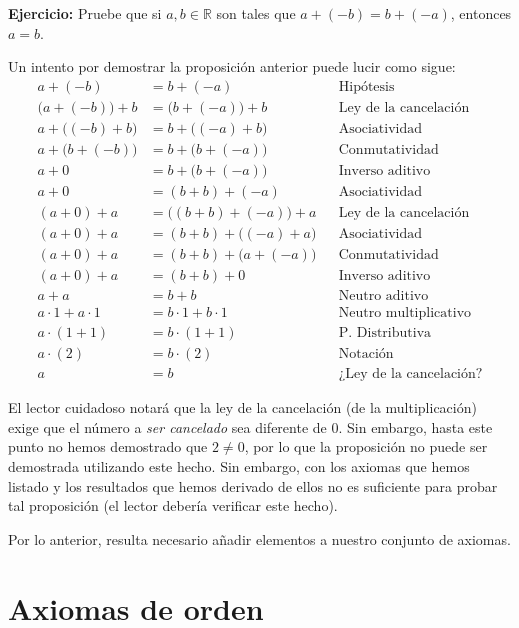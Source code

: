 \documentclass[11pt]{article}
\newcommand{\R}{\mathbb{R}}
\begin{document}
\textbf{Ejercicio:} Pruebe que si $a,b\in \R$ son tales que $a+(-b)=b+(-a)$, entonces $a=b$.
    
Un intento por demostrar la proposición anterior puede lucir como sigue: \begin{align*}
a+(-b)&=b+(-a) && \text{Hipótesis} \\
\bigl(a+(-b)\bigr)+b&=\bigl(b+(-a)\bigr)+b&&\text{Ley de la cancelación} \\
a + \bigl((-b)+b\bigr)&= b+\bigl((-a)+b\bigr)&&\text{Asociatividad} \\
a + \bigl(b+(-b)\bigr)&= b+\bigl(b+(-a)\bigr)&&\text{Conmutatividad} \\
a + 0&= b+\bigl(b+(-a)\bigr)&&\text{Inverso aditivo} \\
a + 0&= (b+b)+(-a)&&\text{Asociatividad} \\
(a + 0) + a&= \bigl((b+b)+(-a)\bigr)+a&&\text{Ley de la cancelación} \\
(a + 0) + a&= (b+b)+\bigl((-a)+a\bigr)&&\text{Asociatividad} \\
(a + 0) + a&= (b+b)+\bigl(a+(-a)\bigr)&&\text{Conmutatividad} \\
(a + 0) + a&= (b+b)+0&&\text{Inverso aditivo} \\
a+ a&= b+b&&\text{Neutro aditivo} \\
a\cdot 1+ a\cdot 1&= b\cdot 1+ b\cdot 1&&\text{Neutro multiplicativo} \\
a\cdot (1+1)&= b\cdot (1+1)&&\text{P. Distributiva} \\
a\cdot (2) &= b\cdot (2) &&\text{Notación} \\
a &= b && \text{¿Ley de la cancelación?}
\end{align*}

El lector cuidadoso notará que la ley de la cancelación (de la multiplicación) exige que el número a \textit{ser cancelado} sea diferente de $0$. Sin embargo, hasta este punto no hemos demostrado que $2\neq 0$, por lo que la proposición no puede ser demostrada utilizando este hecho. Sin embargo, con los axiomas que hemos listado y los resultados que hemos derivado de ellos no es suficiente para probar tal proposición (el lector debería verificar este hecho).

Por lo anterior, resulta necesario añadir elementos a nuestro conjunto de axiomas.

\pagebreak
\section*{Axiomas de orden}
\end{document}
